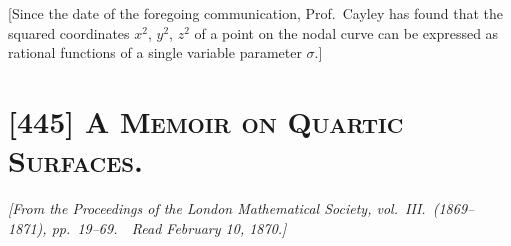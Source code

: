 \documentclass[11pt,a4paper]{article}
\begin{document}
\medskip

[Since the date of the foregoing communication, Prof.\ Cayley has found that the squared
coordinates $x^2$, $y^2$, $z^2$ of a point on the nodal curve can be expressed as rational
functions of a single variable parameter $\sigma$.]

\bigskip

\section{[445] \textsc{A Memoir on Quartic Surfaces.}}

\begin{center}
\textit{[From the Proceedings of the London Mathematical Society, vol.\ III.\ (1869--1871),
pp.\ 19--69.\ \ Read February 10, 1870.]}
\end{center}

\medskip
\end{document}

